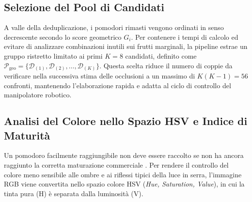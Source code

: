 \subsection{Selezione del Pool di Candidati}
\label{subsec:selezione_pool}

A valle della deduplicazione, i pomodori rimasti vengono ordinati in senso decrescente secondo lo score geometrico $G_i$. Per contenere i tempi di calcolo ed evitare di analizzare combinazioni inutili sui frutti marginali, la pipeline estrae un gruppo ristretto limitato ai primi $K = 8$ candidati, definito come $\mathcal{P}_{\text{geo}} = \{ \mathcal{D}_{(1)}, \mathcal{D}_{(2)}, \dots, \mathcal{D}_{(K)} \}$. Questa scelta riduce il numero di coppie da verificare nella successiva stima delle occlusioni a un massimo di $K(K-1) = 56$ confronti, mantenendo l'elaborazione rapida e adatta al ciclo di controllo del manipolatore robotico.

\subsection{Analisi del Colore nello Spazio HSV e Indice di Maturità}
\label{subsec:filtro_hsv}

Un pomodoro facilmente raggiungibile non deve essere raccolto se non ha ancora raggiunto la corretta maturazione commerciale \cite{ahmad2026comparative, xiao2023fruit}. Per rendere il controllo del colore meno sensibile alle ombre e ai riflessi tipici della luce in serra, l'immagine RGB viene convertita nello spazio colore HSV (\textit{Hue, Saturation, Value}), in cui la tinta pura (H) è separata dalla luminosità (V).

